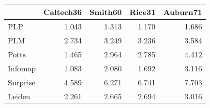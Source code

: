 \begin{tabular}{lrrrr}
\toprule
{} & Caltech36 & Smith60 & Rice31 & Auburn71 \\
\midrule
PLP      &     1.043 &   1.313 &  1.170 &    1.686 \\
PLM      &     2.734 &   3.249 &  3.236 &    3.584 \\
Potts    &     1.465 &   2.964 &  2.785 &    4.412 \\
Infomap  &     1.083 &   2.080 &  1.692 &    3.116 \\
Surprise &     4.589 &   6.271 &  6.741 &    7.703 \\
Leiden   &     2.261 &   2.665 &  2.694 &    3.016 \\
\bottomrule
\end{tabular}
